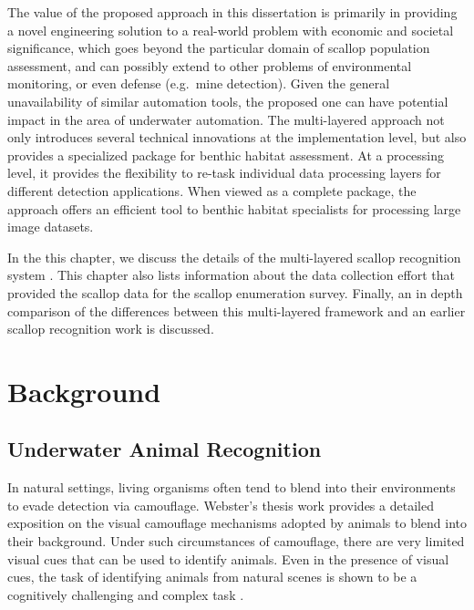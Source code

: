 \documentclass {udthesis}
\begin{document}
The value of the proposed approach in this dissertation is primarily in  providing a novel engineering solution to a real-world problem with economic
and societal significance, which goes beyond the particular domain of scallop population
assessment, and can possibly extend to other problems of environmental monitoring,
or even defense (e.g.\ mine detection).  
Given the general unavailability of similar automation tools, the proposed one
can have potential impact in the area of underwater automation.  
The multi-layered approach not only introduces several technical innovations at 
the implementation level, 
but also provides a specialized package for benthic habitat assessment. 
At a processing level, it provides the flexibility to re-task individual 
data processing layers for different detection applications.
When viewed as a complete package, the approach
offers an efficient tool to benthic habitat specialists for processing 
large image datasets.

In the this chapter, we discuss the details of the multi-layered scallop recognition system  
\cite{prasanna_med, prasanna_aslo, prasanna_igi}. This chapter also lists information about the data collection effort that provided the scallop data for the scallop enumeration survey. Finally, an in depth comparison of the differences between this multi-layered framework and an earlier scallop recognition work \cite{dawkings13} is discussed.

\section{Background}

\subsection{Underwater Animal Recognition}
\label{sec:animal_lit}

In natural settings, living organisms often tend to blend into their environments to evade detection via camouflage. Webster's thesis work \cite{webster} provides a detailed exposition on the visual camouflage mechanisms adopted by animals to blend into their background. Under such circumstances of camouflage, there are very limited visual cues that can be used to identify animals. Even in the presence of visual cues, the task of identifying animals from natural scenes is shown to be a cognitively challenging and complex task \cite{wichmann}.
\end{document}

